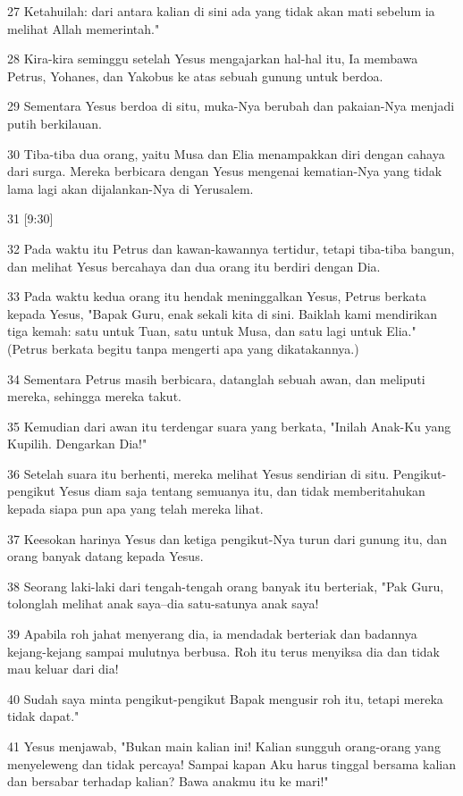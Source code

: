 \par 27 Ketahuilah: dari antara kalian di sini ada yang tidak akan mati sebelum ia melihat Allah memerintah."
\par 28 Kira-kira seminggu setelah Yesus mengajarkan hal-hal itu, Ia membawa Petrus, Yohanes, dan Yakobus ke atas sebuah gunung untuk berdoa.
\par 29 Sementara Yesus berdoa di situ, muka-Nya berubah dan pakaian-Nya menjadi putih berkilauan.
\par 30 Tiba-tiba dua orang, yaitu Musa dan Elia menampakkan diri dengan cahaya dari surga. Mereka berbicara dengan Yesus mengenai kematian-Nya yang tidak lama lagi akan dijalankan-Nya di Yerusalem.
\par 31 [9:30]
\par 32 Pada waktu itu Petrus dan kawan-kawannya tertidur, tetapi tiba-tiba bangun, dan melihat Yesus bercahaya dan dua orang itu berdiri dengan Dia.
\par 33 Pada waktu kedua orang itu hendak meninggalkan Yesus, Petrus berkata kepada Yesus, "Bapak Guru, enak sekali kita di sini. Baiklah kami mendirikan tiga kemah: satu untuk Tuan, satu untuk Musa, dan satu lagi untuk Elia." (Petrus berkata begitu tanpa mengerti apa yang dikatakannya.)
\par 34 Sementara Petrus masih berbicara, datanglah sebuah awan, dan meliputi mereka, sehingga mereka takut.
\par 35 Kemudian dari awan itu terdengar suara yang berkata, "Inilah Anak-Ku yang Kupilih. Dengarkan Dia!"
\par 36 Setelah suara itu berhenti, mereka melihat Yesus sendirian di situ. Pengikut-pengikut Yesus diam saja tentang semuanya itu, dan tidak memberitahukan kepada siapa pun apa yang telah mereka lihat.
\par 37 Keesokan harinya Yesus dan ketiga pengikut-Nya turun dari gunung itu, dan orang banyak datang kepada Yesus.
\par 38 Seorang laki-laki dari tengah-tengah orang banyak itu berteriak, "Pak Guru, tolonglah melihat anak saya--dia satu-satunya anak saya!
\par 39 Apabila roh jahat menyerang dia, ia mendadak berteriak dan badannya kejang-kejang sampai mulutnya berbusa. Roh itu terus menyiksa dia dan tidak mau keluar dari dia!
\par 40 Sudah saya minta pengikut-pengikut Bapak mengusir roh itu, tetapi mereka tidak dapat."
\par 41 Yesus menjawab, "Bukan main kalian ini! Kalian sungguh orang-orang yang menyeleweng dan tidak percaya! Sampai kapan Aku harus tinggal bersama kalian dan bersabar terhadap kalian? Bawa anakmu itu ke mari!"
